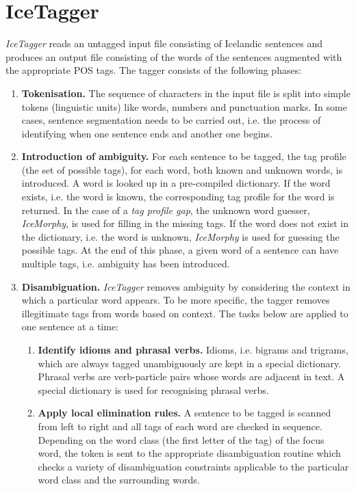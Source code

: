 \documentclass[11pt]{article}
\begin{document}
\section{IceTagger}
\label{sec:algorithm}
\emph{IceTagger} reads an untagged input file consisting of Icelandic sentences and produces an output file consisting of the words of the sentences augmented with the appropriate POS tags.
The tagger consists of the following phases:
\begin{enumerate}
\item {\bf Tokenisation.}
The sequence of characters in the input file is split into simple tokens (linguistic units) like words, numbers and punctuation marks. In some cases, sentence segmentation needs to be carried out, i.e. the process of identifying when one sentence ends and another one begins.
\item {\bf Introduction of ambiguity.}
For each sentence to be tagged, the tag profile (the set of possible tags), for each word, both known and unknown words, is introduced.
A word is looked up in a pre-compiled dictionary. If the word exists, i.e. the word is known, the corresponding tag profile for the word is returned.
In the case of a \emph{tag profile gap}, the unknown word guesser, \emph{IceMorphy}, is used for filling in the missing tags.
If the word does not exist in the dictionary, i.e. the word is unknown, \emph{IceMorphy} is used for guessing the possible tags.
At the end of this phase, a given word of a sentence can have multiple tags, i.e. ambiguity has been introduced.
\item {\bf Disambiguation.}
\emph{IceTagger} removes ambiguity by considering the context in which a particular word appears.
To be more specific, the tagger removes illegitimate tags from words based on context.
The tasks below are applied to one sentence at a time:
\begin{enumerate}
\item {\bf Identify idioms and phrasal verbs.}
Idioms, i.e. bigrams and trigrams, which are always tagged unambiguously are kept in a special dictionary.
Phrasal verbs are verb-particle pairs whose words are adjacent in text.
A special dictionary is used for recognising phrasal verbs.
\item {\bf Apply local elimination rules.}
A sentence to be tagged is scanned from left to right and all tags of each word are checked in sequence.
Depending on the word class (the first letter of the tag) of the focus word, the token is sent to the appropriate disambiguation routine which checks a variety of disambiguation constraints applicable to the particular word class and the surrounding words.

\end{enumerate}
\end{enumerate}
\end{document}
